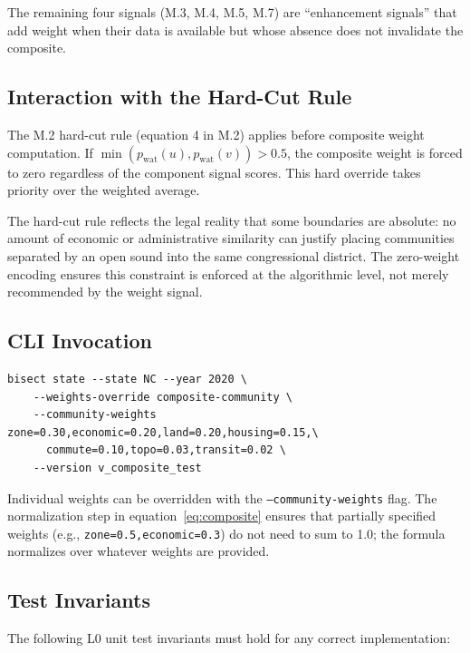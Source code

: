 The remaining four signals (M.3, M.4, M.5, M.7) are ``enhancement signals''
that add weight when their data is available but whose absence does not
invalidate the composite.

\subsection{Interaction with the Hard-Cut Rule}

The M.2 hard-cut rule (equation 4 in M.2) applies before composite weight
computation.
If $\min(p_{\mathrm{wat}}(u), p_{\mathrm{wat}}(v)) > 0.5$,
the composite weight is forced to zero regardless of the component signal scores.
This hard override takes priority over the weighted average.

The hard-cut rule reflects the legal reality that some boundaries are
absolute: no amount of economic or administrative similarity can justify
placing communities separated by an open sound into the same congressional
district.
The zero-weight encoding ensures this constraint is enforced at the
algorithmic level, not merely recommended by the weight signal.

\subsection{CLI Invocation}

\begin{verbatim}
bisect state --state NC --year 2020 \
    --weights-override composite-community \
    --community-weights zone=0.30,economic=0.20,land=0.20,housing=0.15,\
      commute=0.10,topo=0.03,transit=0.02 \
    --version v_composite_test
\end{verbatim}

Individual weights can be overridden with the \texttt{--community-weights} flag.
The normalization step in equation~\eqref{eq:composite} ensures that
partially specified weights (e.g., \texttt{zone=0.5,economic=0.3}) do not
need to sum to 1.0; the formula normalizes over whatever weights are provided.

\subsection{Test Invariants}

The following L0 unit test invariants must hold for any correct implementation:

